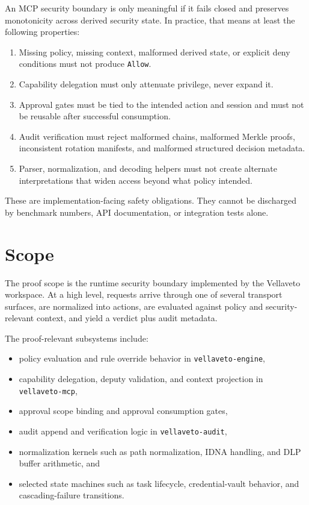 \documentclass[11pt]{article}
\begin{document}
An MCP security boundary is only meaningful if it fails closed and preserves
monotonicity across derived security state. In practice, that means at least
the following properties:

\begin{enumerate}[leftmargin=*]
\item Missing policy, missing context, malformed derived state, or explicit deny
conditions must not produce \texttt{Allow}.
\item Capability delegation must only attenuate privilege, never expand it.
\item Approval gates must be tied to the intended action and session and must
not be reusable after successful consumption.
\item Audit verification must reject malformed chains, malformed Merkle proofs,
inconsistent rotation manifests, and malformed structured decision metadata.
\item Parser, normalization, and decoding helpers must not create alternate
interpretations that widen access beyond what policy intended.
\end{enumerate}

These are implementation-facing safety obligations. They cannot be discharged
by benchmark numbers, API documentation, or integration tests alone.

\section{Scope}

The proof scope is the runtime security boundary implemented by the Vellaveto
workspace. At a high level, requests arrive through one of several transport
surfaces, are normalized into actions, are evaluated against policy and
security-relevant context, and yield a verdict plus audit metadata.

The proof-relevant subsystems include:

\begin{itemize}[leftmargin=*]
\item policy evaluation and rule override behavior in \texttt{vellaveto-engine},
\item capability delegation, deputy validation, and context projection in
\texttt{vellaveto-mcp},
\item approval scope binding and approval consumption gates,
\item audit append and verification logic in \texttt{vellaveto-audit},
\item normalization kernels such as path normalization, IDNA handling, and DLP
buffer arithmetic, and
\item selected state machines such as task lifecycle, credential-vault
behavior, and cascading-failure transitions.
\end{itemize}
\end{document}
